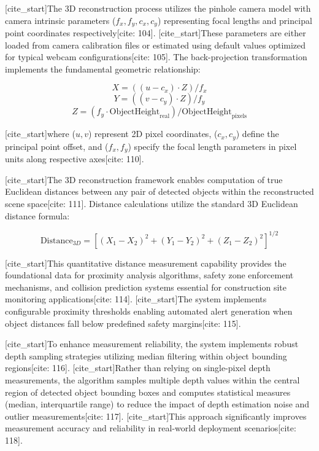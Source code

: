 [cite_start]The 3D reconstruction process utilizes the pinhole camera model with camera intrinsic parameters ($f_x, f_y, c_x, c_y$) representing focal lengths and principal point coordinates respectively[cite: 104]. [cite_start]These parameters are either loaded from camera calibration files or estimated using default values optimized for typical webcam configurations[cite: 105]. The back-projection transformation implements the fundamental geometric relationship:

\begin{equation}
    X = ((u - c_x) \cdot Z) / f_x
\end{equation}
\begin{equation}
    Y = ((v - c_y) \cdot Z) / f_y
\end{equation}
\begin{equation}
    Z = (f_y \cdot \text{ObjectHeight}_{\text{real}}) / \text{ObjectHeight}_{\text{pixels}}
\end{equation}

[cite_start]where ($u, v$) represent 2D pixel coordinates, ($c_x, c_y$) define the principal point offset, and ($f_x, f_y$) specify the focal length parameters in pixel units along respective axes[cite: 110].

[cite_start]The 3D reconstruction framework enables computation of true Euclidean distances between any pair of detected objects within the reconstructed scene space[cite: 111]. Distance calculations utilize the standard 3D Euclidean distance formula:

\begin{equation}
    \text{Distance}_{3D} = [(X_1 - X_2)^2 + (Y_1 - Y_2)^2 + (Z_1 - Z_2)^2]^{1/2}
\end{equation}

[cite_start]This quantitative distance measurement capability provides the foundational data for proximity analysis algorithms, safety zone enforcement mechanisms, and collision prediction systems essential for construction site monitoring applications[cite: 114]. [cite_start]The system implements configurable proximity thresholds enabling automated alert generation when object distances fall below predefined safety margins[cite: 115].

[cite_start]To enhance measurement reliability, the system implements robust depth sampling strategies utilizing median filtering within object bounding regions[cite: 116]. [cite_start]Rather than relying on single-pixel depth measurements, the algorithm samples multiple depth values within the central region of detected object bounding boxes and computes statistical measures (median, interquartile range) to reduce the impact of depth estimation noise and outlier measurements[cite: 117]. [cite_start]This approach significantly improves measurement accuracy and reliability in real-world deployment scenarios[cite: 118].

